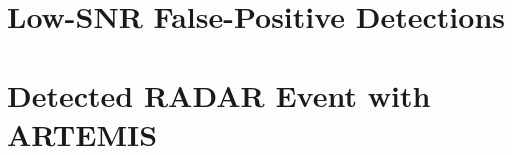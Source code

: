 \documentclass[a4paper,fleqn,usenatbib]{mnras}
\begin{document}
\section{Low-SNR False-Positive Detections}
\label{sec:low_snr}



\section{Detected RADAR Event with ARTEMIS}
\label{sec:LOFAR_RADAR}
\end{document}
